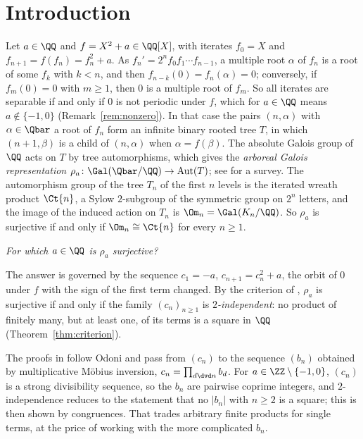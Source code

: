 \chapter*{Introduction}

Let $a \in \QQ$ and $f = X^2 + a \in \QQ[X]$, with iterates $f_0 = X$ and
$f_{n+1} = f(f_n) = f_n^2 + a$. As $f_n' = 2^n f_0 f_1 \cdots f_{n-1}$, a multiple root $\alpha$ of
$f_n$ is a root of some $f_k$ with $k < n$, and then $f_{n-k}(0) = f_n(\alpha) = 0$; conversely,
if $f_m(0) = 0$ with $m \ge 1$, then $0$ is a multiple root of $f_m$. So all iterates are
separable if and only if $0$ is not periodic under $f$, which for $a \in \QQ$ means
$a \notin \{-1, 0\}$ (Remark~\ref{rem:nonzero}). In that case the pairs $(n, \alpha)$ with
$\alpha \in \Qbar$ a root of $f_n$ form an infinite binary rooted tree $T$, in which
$(n + 1, \beta)$ is a child of $(n, \alpha)$ when $\alpha = f(\beta)$. The absolute Galois group of $\QQ$ acts on $T$ by tree automorphisms, which
gives the \emph{arboreal Galois representation} $\rho_a \colon \Gal(\Qbar/\QQ) \to \operatorname{Aut}(T)$;
see \cite{jones} for a survey. The automorphism group of the tree $T_n$ of the first $n$ levels is
the iterated wreath product $\Ct{n}$, a Sylow $2$-subgroup of the symmetric group on $2^n$
letters, and the image of the induced action on $T_n$ is $\Om_n = \Gal(K_n/\QQ)$. So $\rho_a$ is
surjective if and only if $\Om_n \cong \Ct{n}$ for every $n \ge 1$.

\begin{center}
  \emph{For which $a \in \QQ$ is $\rho_a$ surjective?}
\end{center}

The answer is governed by the sequence $c_1 = -a$, $c_{n+1} = c_n^2 + a$, the orbit of $0$ under
$f$ with the sign of the first term changed. By the criterion of \cite{paper}, $\rho_a$ is
surjective if and only if the family $(c_n)_{n \ge 1}$ is \emph{$2$-independent}: no product of
finitely many, but at least one, of its terms is a square in $\QQ$ (Theorem~\ref{thm:criterion}).

The proofs in \cite{paper, li2020, li2021} follow Odoni \cite{odoni} and pass from $(c_n)$ to the
sequence $(b_n)$ obtained by multiplicative Möbius inversion, $c_n = \prod_{d \dvd n} b_d$. For
$a \in \ZZ \setminus \{-1, 0\}$, $(c_n)$ is a strong divisibility sequence, so the $b_n$ are pairwise
coprime integers, and $2$-independence reduces to the statement that no $|b_n|$ with $n \ge 2$ is
a square; this is then shown by congruences. That trades arbitrary finite products for single
terms, at the price of working with the more complicated $b_n$.

